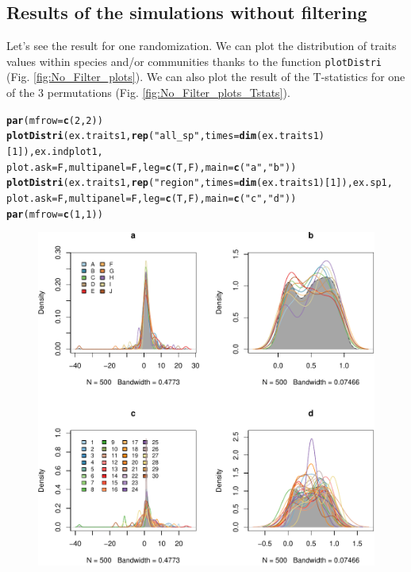 \documentclass[12pt]{article}\usepackage[]{graphicx}\usepackage[]{color}
\makeatletter
\def\maxwidth{ %
  \ifdim\Gin@nat@width>\linewidth
    \linewidth
  \else
    \Gin@nat@width
  \fi
}
\newcommand{\hlnum}[1]{\textcolor[rgb]{0.686,0.059,0.569}{#1}}%
\newcommand{\hlstr}[1]{\textcolor[rgb]{0.192,0.494,0.8}{#1}}%
\newcommand{\hlstd}[1]{\textcolor[rgb]{0.345,0.345,0.345}{#1}}%
\newcommand{\hlkwc}[1]{\textcolor[rgb]{0.333,0.667,0.333}{#1}}%
\newcommand{\hlkwd}[1]{\textcolor[rgb]{0.737,0.353,0.396}{\textbf{#1}}}%
\newenvironment{kframe}{%
 \def\at@end@of@kframe{}%
 \ifinner\ifhmode%
  \def\at@end@of@kframe{\end{minipage}}%
  \begin{minipage}{\columnwidth}%
 \fi\fi%
 \def\FrameCommand##1{\hskip\@totalleftmargin \hskip-\fboxsep
 \colorbox{shadecolor}{##1}\hskip-\fboxsep
     \hskip-\linewidth \hskip-\@totalleftmargin \hskip\columnwidth}%
 \MakeFramed {\advance\hsize-\width
   \@totalleftmargin\z@ \linewidth\hsize
   \@setminipage}}%
 {\par\unskip\endMakeFramed%
 \at@end@of@kframe}
\newenvironment{knitrout}{}{} %
\makeatother
\begin{document}
  \subsection {Results of the simulations without filtering}
Let's see the result for one randomization. We can plot the distribution of traits values within species and/or communities thanks to the function \texttt{plotDistri} (Fig. \ref{fig:No_Filter_plots}). We can also plot the result of the T-statistics for one of the 3 permutations (Fig. \ref{fig:No_Filter_plots_Tstats}).

\begin{knitrout}\small
{}\color{fgcolor}\begin{kframe}
\begin{alltt}
\hlkwd{par}\hlstd{(}\hlkwc{mfrow}\hlstd{=}\hlkwd{c}\hlstd{(}\hlnum{2}\hlstd{,} \hlnum{2}\hlstd{))}
\hlkwd{plotDistri}\hlstd{(ex.traits1,} \hlkwd{rep}\hlstd{(}\hlstr{"all_sp"}\hlstd{,} \hlkwc{times} \hlstd{=} \hlkwd{dim}\hlstd{(ex.traits1)[}\hlnum{1}\hlstd{]), ex.indplot1,}
           \hlkwc{plot.ask} \hlstd{= F,} \hlkwc{multipanel} \hlstd{= F,} \hlkwc{leg} \hlstd{=}\hlkwd{c}\hlstd{(T, F),} \hlkwc{main} \hlstd{=} \hlkwd{c}\hlstd{(}\hlstr{"a"}\hlstd{,} \hlstr{"b"}\hlstd{))}
\hlkwd{plotDistri}\hlstd{(ex.traits1,} \hlkwd{rep}\hlstd{(}\hlstr{"region"}\hlstd{,} \hlkwc{times} \hlstd{=} \hlkwd{dim}\hlstd{(ex.traits1)[}\hlnum{1}\hlstd{]), ex.sp1,}
           \hlkwc{plot.ask} \hlstd{= F,} \hlkwc{multipanel} \hlstd{= F,} \hlkwc{leg} \hlstd{=}\hlkwd{c}\hlstd{(T, F),} \hlkwc{main} \hlstd{=} \hlkwd{c}\hlstd{(}\hlstr{"c"}\hlstd{,} \hlstr{"d"}\hlstd{))}
\hlkwd{par}\hlstd{(}\hlkwc{mfrow}\hlstd{=}\hlkwd{c}\hlstd{(}\hlnum{1}\hlstd{,} \hlnum{1}\hlstd{))}
\end{alltt}
\end{kframe}\begin{figure}

{\centering \includegraphics[width=\maxwidth]{figure/No_Filter_plots-1} 

}
\end{figure}
\end{knitrout}
\end{document}
